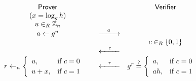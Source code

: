 \documentclass{article}
\begin{document}
	
\[
\begin{array}{c c c}
\text{\textsf{Prover}} & & \text{\textsf{Verifier}} \\
(x = \log_g h) & & \\
u\in_R \mathbb{Z}_n & & \\
a \gets g^u & \xrightarrow{\hspace{1em}a\hspace{1em}} & \\
& & c\in_R \{0,1\} \\
& \xleftarrow{\hspace{1em}c\hspace{1em}} & \\
r\gets_n\begin{cases}
\begin{array}{l l}
u, & \text{if}\ c=0 \\
u + x, & \text{if}\ c=1 
\end{array}
\end{cases} & \xleftarrow{\hspace{1em}r\hspace{1em}} & g^r \stackrel{?}{=}
\begin{cases}
\begin{array}{l l}
a, & \text{if}\ c=0 \\
ah, & \text{if}\ c=1
\end{array}
\end{cases}
\end{array}
\]
\end{document}
